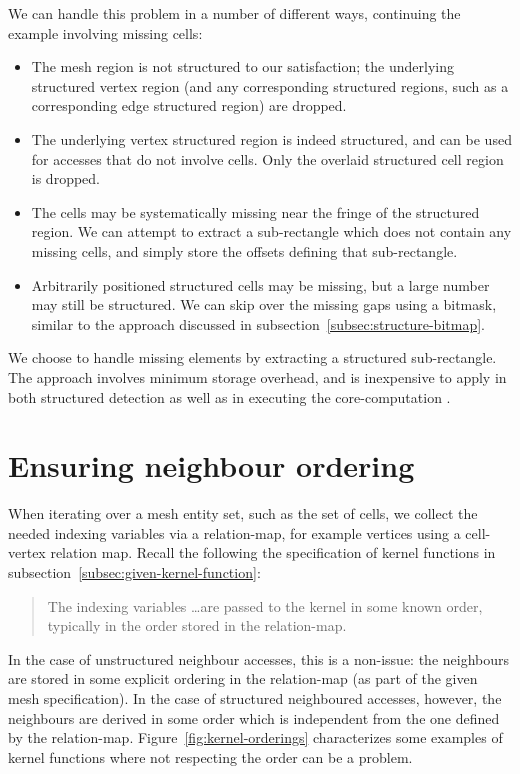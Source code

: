 We can handle this problem in a number of different ways, continuing the example involving missing cells:
\begin{itemize}
\item The mesh region is not structured to our satisfaction; the underlying structured vertex region (and any corresponding structured regions, such as a corresponding edge structured region) are dropped.
\item The underlying vertex structured region is indeed structured, and can be used for accesses that do not involve cells. Only the overlaid structured cell region is dropped.
\item The cells may be systematically missing near the fringe of the structured region. We can attempt to extract a sub-rectangle which does not contain any missing cells, and simply store the offsets defining that sub-rectangle.
\item Arbitrarily positioned structured cells may be missing, but a large number may still be structured. We can skip over the missing gaps using a bitmask, similar to the approach discussed in subsection~\ref{subsec:structure-bitmap}.
\end{itemize}

We choose to handle missing elements by extracting a structured sub-rectangle. The approach involves minimum storage overhead, and is inexpensive to apply in both structured detection as well as in executing the core-computation .


\section{Ensuring neighbour ordering}
When iterating over a mesh entity set, such as the set of cells, we collect the needed indexing variables via a relation-map, for example vertices using a cell-vertex relation map. Recall the following the specification of kernel functions in subsection~\ref{subsec:given-kernel-function}:
\begin{quote}
The indexing variables \ldots are passed to the kernel in some known order, typically in the order stored in the relation-map.
\end{quote}

In the case of unstructured neighbour accesses, this is a non-issue: the neighbours are stored in some explicit ordering in the relation-map (as part of the given mesh specification). In the case of structured neighboured accesses, however, the neighbours are derived in some order which is independent from the one defined by the relation-map. Figure~\ref{fig:kernel-orderings} characterizes some examples of kernel functions where not respecting the order can be a problem.


